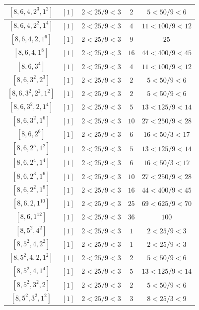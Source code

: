 \documentclass{article}%
\begin{document}
\begin{center}
\begin{longtable}{||c|c|c|c|c||}
$[8, 6, 4, 2^{3}, 1^{2}]$ & $[1]$ & $2 < 25/9 < 3$ & $2$ & $5 < 50/9 < 6$ \\ \hline 
$[8, 6, 4, 2^{2}, 1^{4}]$ & $[1]$ & $2 < 25/9 < 3$ & $4$ & $11 < 100/9 < 12$ \\ \hline 
$[8, 6, 4, 2, 1^{6}]$ & $[1]$ & $2 < 25/9 < 3$ & $9$ & $25$ \\ \hline 
$[8, 6, 4, 1^{8}]$ & $[1]$ & $2 < 25/9 < 3$ & $16$ & $44 < 400/9 < 45$ \\ \hline 
$[8, 6, 3^{4}]$ & $[1]$ & $2 < 25/9 < 3$ & $4$ & $11 < 100/9 < 12$ \\ \hline 
$[8, 6, 3^{2}, 2^{3}]$ & $[1]$ & $2 < 25/9 < 3$ & $2$ & $5 < 50/9 < 6$ \\ \hline 
$[8, 6, 3^{2}, 2^{2}, 1^{2}]$ & $[1]$ & $2 < 25/9 < 3$ & $2$ & $5 < 50/9 < 6$ \\ \hline 
$[8, 6, 3^{2}, 2, 1^{4}]$ & $[1]$ & $2 < 25/9 < 3$ & $5$ & $13 < 125/9 < 14$ \\ \hline 
$[8, 6, 3^{2}, 1^{6}]$ & $[1]$ & $2 < 25/9 < 3$ & $10$ & $27 < 250/9 < 28$ \\ \hline 
$[8, 6, 2^{6}]$ & $[1]$ & $2 < 25/9 < 3$ & $6$ & $16 < 50/3 < 17$ \\ \hline 
$[8, 6, 2^{5}, 1^{2}]$ & $[1]$ & $2 < 25/9 < 3$ & $5$ & $13 < 125/9 < 14$ \\ \hline 
$[8, 6, 2^{4}, 1^{4}]$ & $[1]$ & $2 < 25/9 < 3$ & $6$ & $16 < 50/3 < 17$ \\ \hline 
$[8, 6, 2^{3}, 1^{6}]$ & $[1]$ & $2 < 25/9 < 3$ & $10$ & $27 < 250/9 < 28$ \\ \hline 
$[8, 6, 2^{2}, 1^{8}]$ & $[1]$ & $2 < 25/9 < 3$ & $16$ & $44 < 400/9 < 45$ \\ \hline 
$[8, 6, 2, 1^{10}]$ & $[1]$ & $2 < 25/9 < 3$ & $25$ & $69 < 625/9 < 70$ \\ \hline 
$[8, 6, 1^{12}]$ & $[1]$ & $2 < 25/9 < 3$ & $36$ & $100$ \\ \hline 
$[8, 5^{2}, 4^{2}]$ & $[1]$ & $2 < 25/9 < 3$ & $1$ & $2 < 25/9 < 3$ \\ \hline 
$[8, 5^{2}, 4, 2^{2}]$ & $[1]$ & $2 < 25/9 < 3$ & $1$ & $2 < 25/9 < 3$ \\ \hline 
$[8, 5^{2}, 4, 2, 1^{2}]$ & $[1]$ & $2 < 25/9 < 3$ & $2$ & $5 < 50/9 < 6$ \\ \hline 
$[8, 5^{2}, 4, 1^{4}]$ & $[1]$ & $2 < 25/9 < 3$ & $5$ & $13 < 125/9 < 14$ \\ \hline 
$[8, 5^{2}, 3^{2}, 2]$ & $[1]$ & $2 < 25/9 < 3$ & $2$ & $5 < 50/9 < 6$ \\ \hline 
$[8, 5^{2}, 3^{2}, 1^{2}]$ & $[1]$ & $2 < 25/9 < 3$ & $3$ & $8 < 25/3 < 9$ \\ \hline 

\end{longtable}
\end{center}
\end{document}
